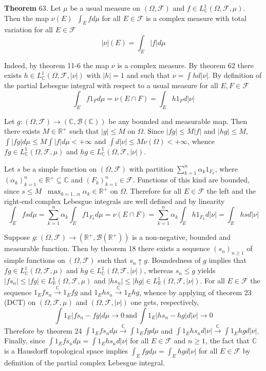 \documentclass[a4paper]{article}
\newcommand{\brac}[1]{\left ( #1 \right )}
\newcommand{\abs}[1]{\left | #1 \right |}
\newcommand{\Real}{\mathbb{R}}
\newcommand{\Cplx}{\mathbb{C}}
\newcommand{\Fcal}{\mathcal{F}}
\newcommand{\borel}[1]{\mathcal{B}\brac{#1}}
\newcommand{\defn}{\mathop{\overset{\Delta}{=}}\nolimits}
\begin{document}
\label{thm:tot_var_modulus_int} \noindent \textbf{Theorem} 63.
Let $\mu$ be a usual measure on $\brac{\Omega, \Fcal}$ and $f\in L^1_\Cplx\brac{\Omega, \Fcal, \mu}$. Then the map $\nu\brac{E}\defn \int_E f d\mu$ for all $E\in \Fcal$ is a complex measure with total variation for all $E\in \Fcal$ \[\abs{\nu}\brac{E} = \int_E \abs{f} d\mu\]

Indeed, by theorem 11-6 the map $\nu$ is a complex measure. By theorem 62 there exists $h\in L^1_\Cplx\brac{\Omega, \Fcal, \abs{\nu}}$ with $\abs{h}=1$ and such that $\nu = \int h d\abs{\nu}$. By definition of the partial Lebesgue integral with respect to a usual measure for all $E, F\in \Fcal$ \[\int_E f 1_F d\mu = \nu\brac{E\cap F} = \int_E h 1_F d\abs{\nu}\]

Let $g:\brac{\Omega, \Fcal}\to \brac{\Cplx,\borel{\Cplx}}$ be any bounded and measurable map. Then there exists $M\in \Real^+$ such that $\abs{g}\leq M$ on $\Omega$. Since $\abs{f g}\leq M\abs{f}$ and $\abs{h g}\leq M$, $\int \abs{f g} d\mu \leq M\int \abs{f} d\mu < +\infty$ and $\int d\abs{\nu} \leq M \nu\brac{\Omega}<+\infty$, whence $fg \in L^1_\Cplx\brac{\Omega, \Fcal, \mu}$ and $hg \in L^1_\Cplx\brac{\Omega, \Fcal, \abs{\nu}}$.

Let $s$ be a simple function on $\brac{\Omega, \Fcal}$ with partition $\sum_{k=1}^n \alpha_k 1_{F_k}$, where $\brac{\alpha_k}_{k=1}^n\in \Real^+\subseteq \Cplx$ and $\brac{F_k}_{k=1}^n\in \Fcal$. Functions of this kind are bounded, since $s\leq M\defn \max_{k=1\ldots n} \alpha_k\in \Real^+$ on $\Omega$. Therefore for all $E\in \Fcal$ the left and the right-end complex Lebesgue integrals are well defined and by linearity \[\int_E f s d\mu = \sum_{k=1}^n \alpha_k \int_E f 1_{F_k} d\mu = \nu\brac{E\cap F} = \sum_{k=1}^n \alpha_k \int_E h 1_{F_k} d\abs{\nu} = \int_E h s d\abs{\nu}\]

Suppose $g:\brac{\Omega, \Fcal}\to \brac{\Real^+,\borel{\Real^+}}$ is a non-negative, bounded and measurable function. Then by theorem 18 there exists a sequence $\brac{s_n}_{n\geq 1}$ of simple functions on $\brac{\Omega, \Fcal}$ such that $s_n\uparrow g$. Boundedness of $g$ implies that $f g\in L^1_\Cplx\brac{\Omega, \Fcal, \mu}$ and $h g \in L^1_\Cplx\brac{\Omega, \Fcal, \abs{\nu}}$, whereas $s_n\leq g$ yields $\abs{f s_n}\leq \abs{f g}\in L^1_\Real\brac{\Omega, \Fcal, \mu}$ and $\abs{h s_n}\leq \abs{h g}\in L^1_\Real\brac{\Omega, \Fcal, \abs{\nu}}$. For all $E\in \Fcal$ the sequence $1_E f s_n\overset{\Cplx}{\to} 1_E f g$ and $1_E h s_n\overset{\Cplx}{\to} 1_E h g$, whence by applying of theorem 23 (DCT) on $\brac{\Omega, \Fcal, \mu}$ and $\brac{\Omega, \Fcal, \abs{\nu}}$ one gets, respectively, \[\int 1_E\abs{f s_n - f g} d\mu\to 0\,\text{and}\,\int 1_E\abs{h s_n - h g} d\abs{\nu}\to 0\] Therefore by theorem 24 $\int 1_E f s_n d\mu \overset{\Cplx}{\to} \int 1_E f g d\mu$ and $\int 1_E h s_n d\abs{\nu} \overset{\Cplx}{\to} \int 1_E h g d\abs{\nu}$. Finally, since $\int 1_E f s_n d\mu = \int 1_E h s_n d\abs{\nu}$ for all $E\in \Fcal$ and $n\geq 1$, the fact that $\Cplx$ is a Hausdorff topological space implies $\int_E f g d\mu = \int_E h g d\abs{\nu}$ for all $E\in \Fcal$ by definition of the partial complex Lebesgue integral.
\end{document}
